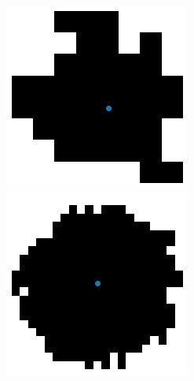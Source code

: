 \documentclass[11pt]{article}
\numberwithin{equation}{section}
\begin{document}
\begin{figure}[!htb]
  \captionsetup{width=.9\linewidth}
    \includegraphics[width=\linewidth]{idla_40.png}
  \endminipage\hfill
    \includegraphics[width=\linewidth]{idla_300.png}

\end{figure}
\end{document}
